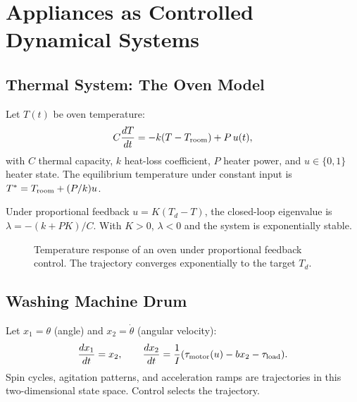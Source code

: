 \documentclass[12pt,openany]{book}
\begin{document}
\chapter{Appliances as Controlled Dynamical Systems}
\label{ch:appliances}

\section{Thermal System: The Oven Model}

Let $T(t)$ be oven temperature:
\[
  C\frac{dT}{dt} = -k(T-T_{\rm room}) + P\,u(t),
\]
with $C$ thermal capacity, $k$ heat-loss coefficient, $P$ heater power, and
$u\in\{0,1\}$ heater state. The equilibrium temperature under constant input is
$T^* = T_{\rm room} + (P/k)u$.

Under proportional feedback $u=K(T_d-T)$, the closed-loop eigenvalue is
$\lambda=-(k+PK)/C$. With $K>0$, $\lambda<0$ and the system is exponentially
stable.

\begin{figure}[H]
\centering
{}
\caption{Temperature response of an oven under proportional feedback control.
The trajectory converges exponentially to the target $T_d$.}
\label{fig:oven}
\end{figure}

\section{Washing Machine Drum}

Let $x_1=\theta$ (angle) and $x_2=\dot\theta$ (angular velocity):
\[
  \frac{dx_1}{dt} = x_2, \qquad
  \frac{dx_2}{dt} = \frac{1}{I}(\tau_{\rm motor}(u) - bx_2 - \tau_{\rm load}).
\]
Spin cycles, agitation patterns, and acceleration ramps are trajectories in
this two-dimensional state space. Control selects the trajectory.
\end{document}
